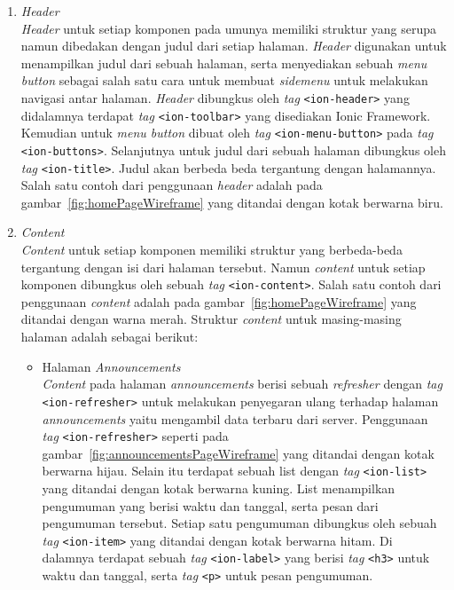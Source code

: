 	\begin{enumerate}
		\item \textit{Header} \\
			\textit{Header} untuk setiap komponen pada umunya memiliki struktur yang serupa namun dibedakan dengan judul dari setiap halaman. \textit{Header} digunakan untuk menampilkan judul dari sebuah halaman, serta menyediakan sebuah \textit{menu button} sebagai salah satu cara untuk membuat \textit{sidemenu} untuk melakukan navigasi antar halaman. \textit{Header} dibungkus oleh \textit{tag} \texttt{<ion-header>} yang didalamnya terdapat \textit{tag} \texttt{<ion-toolbar>} yang disediakan Ionic Framework. Kemudian untuk \textit{menu button} dibuat oleh \textit{tag} \texttt{<ion-menu-button>} pada \textit{tag} \texttt{<ion-buttons>}. Selanjutnya untuk judul dari sebuah halaman dibungkus oleh \textit{tag} \texttt{<ion-title>}. Judul akan berbeda beda tergantung dengan halamannya. Salah satu contoh dari penggunaan \textit{header} adalah pada gambar~\ref{fig:homePageWireframe} yang ditandai dengan kotak berwarna biru.
			
		\item \textit{Content} \\
			\textit{Content} untuk setiap komponen memiliki struktur yang berbeda-beda tergantung dengan isi dari halaman tersebut. Namun \textit{content} untuk setiap komponen dibungkus oleh sebuah \textit{tag} \texttt{<ion-content>}. Salah satu contoh dari penggunaan \textit{content} adalah pada gambar~\ref{fig:homePageWireframe} yang ditandai dengan warna merah. Struktur \textit{content} untuk masing-masing halaman adalah sebagai berikut:
			
			\begin{itemize}
				\item Halaman \textit{Announcements} \\
					\textit{Content} pada halaman \textit{announcements} berisi sebuah \textit{refresher} dengan \textit{tag} \texttt{<ion-refresher>} untuk melakukan penyegaran ulang terhadap halaman \textit{announcements} yaitu mengambil data terbaru dari server. Penggunaan \textit{tag} \texttt{<ion-refresher>} seperti pada gambar~\ref{fig:announcementsPageWireframe} yang ditandai dengan kotak berwarna hijau. Selain itu terdapat sebuah list dengan \textit{tag} \texttt{<ion-list>} yang ditandai dengan kotak berwarna kuning. List menampilkan pengumuman yang berisi waktu dan tanggal, serta pesan dari pengumuman tersebut. Setiap satu pengumuman dibungkus oleh sebuah \textit{tag} \texttt{<ion-item>} yang ditandai dengan kotak berwarna hitam. Di dalamnya terdapat sebuah \textit{tag} \texttt{<ion-label>} yang berisi \textit{tag} \texttt{<h3>} untuk waktu dan tanggal, serta \textit{tag} \texttt{<p>} untuk pesan pengumuman.		
				

\end{itemize}
\end{enumerate}
